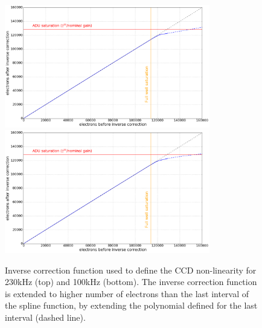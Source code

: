 \documentclass[11pt]{article}      %
\begin{document}
\begin{figure}[hbtp]
  \begin{center}
    \includegraphics[width=0.8\textwidth]{ccdNonLinearity2_2018.png}
    \includegraphics[width=0.8\textwidth]{ccdNonLinearity2_100kHz_2018.png}
    \caption{Inverse correction function used to define the CCD non-linearity for 230kHz (top) and 100kHz (bottom). The inverse correction function is extended to higher number of electrons than the last interval of the spline function, by extending the polynomial defined for the last interval (dashed line).}
    \label{fig:ccdNonLinearity2}
  \end{center}
\end{figure}
\end{document}
